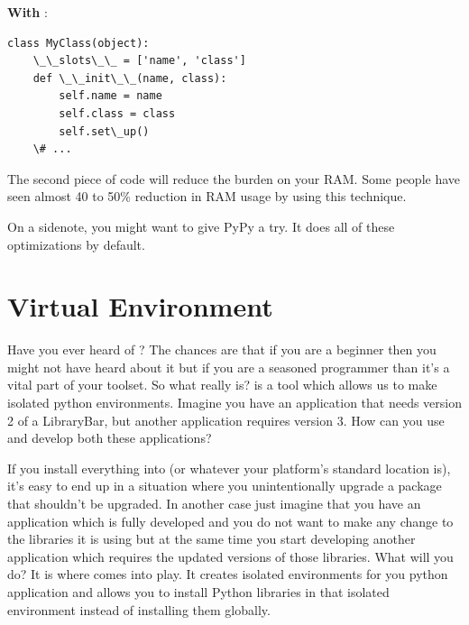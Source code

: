 \documentclass[a4paper,12pt,oneside]{sphinxmanual}
\begin{document}
\textbf{With} :
\begin{Verbatim}[commandchars=\\\{\}]
class MyClass(object):
    \_\_slots\_\_ = ['name', 'class']
    def \_\_init\_\_(name, class):
        self.name = name
        self.class = class
        self.set\_up()
    \# ...
\end{Verbatim}

The second piece of code will reduce the burden on your RAM. Some people
have seen almost 40 to 50\% reduction in RAM usage by using this
technique.

On a sidenote, you might want to give PyPy a try. It does all of these
optimizations by default.


\chapter{Virtual Environment}
\label{virtual_environment::doc}\label{virtual_environment:virtual-environment}
Have you ever heard of ? The chances are that if you are a
beginner then you might not have heard about it but if you are a
seasoned programmer than it's a vital part of your toolset. So what
 really is?  is a tool which allows us to
make isolated python environments. Imagine you have an application that
needs version 2 of a LibraryBar, but another application requires
version 3. How can you use and develop both these applications?

If you install everything into  (or
whatever your platform's standard location is), it's easy to end up in a
situation where you unintentionally upgrade a package that shouldn't be
upgraded. In another case just imagine that you have an application
which is fully developed and you do not want to make any change to the
libraries it is using but at the same time you start developing another
application which requires the updated versions of those libraries. What
will you do? It is where  comes into play. It creates
isolated environments for you python application and allows you to
install Python libraries in that isolated environment instead of
installing them globally.
\end{document}
